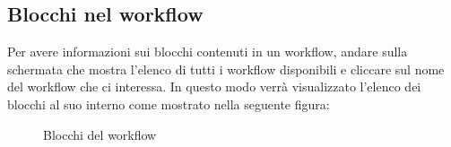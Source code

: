 \subsection{Blocchi nel workflow}
Per avere informazioni sui blocchi contenuti in un workflow, andare sulla schermata che mostra l'elenco di tutti i workflow disponibili  e cliccare sul nome del workflow che ci interessa.
In questo modo verrà visualizzato l'elenco dei blocchi al suo interno come mostrato nella seguente figura:
\begin{figure}[!ht]
	\centering
	\caption{Blocchi del workflow}
\end{figure}
\newpage
